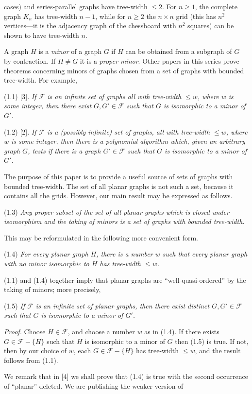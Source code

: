 \noindent cases) and series-parallel graphs have tree-width $\le 2$. For $n \ge 1$, the complete graph $K_n$ has tree-width $n - 1$, while for $n \ge 2$ the $n \times n$ grid (this has $n^2$ vertices---it is the adjacency graph of the chessboard with $n^2$ squares) can be shown to have tree-width $n$.

A graph $H$ is a \textit{minor} of a graph $G$ if $H$ can be obtained from a subgraph of $G$ by contraction. If $H \ne G$ it is a \textit{proper minor}. Other papers in this series prove theorems concerning minors of graphs chosen from a set of graphs with bounded tree-width. For example,

\stmt
(1.1) [3]. \textit{If $\mathcal{F}$ is an infinite set of graphs all with tree-width $\le w$, where $w$ is some integer, then there exist $G, G' \in \mathcal{F}$ such that $G$ is isomorphic to a minor of $G'$.}

\stmt
(1.2) [2]. \textit{If $\mathcal{F}$ is a (possibly infinite) set of graphs, all with tree-width $\le w$, where $w$ is some integer, then there is a polynomial algorithm which, given an arbitrary graph $G$, tests if there is a graph $G' \in \mathcal{F}$ such that $G$ is isomorphic to a minor of $G'$.}

The purpose of this paper is to provide a useful source of sets of graphs with bounded tree-width. The set of all planar graphs is not such a set, because it contains all the grids. However, our main result may be expressed as follows.

\stmt
(1.3) \textit{Any proper subset of the set of all planar graphs which is closed under isomorphism and the taking of minors is a set of graphs with bounded tree-width.}

This may be reformulated in the following more convenient form.

\stmt
(1.4) \textit{For every planar graph $H$, there is a number $w$ such that every planar graph with no minor isomorphic to $H$ has tree-width $\le w$.}

\stmt
(1.1) and (1.4) together imply that planar graphs are ``well-quasi-ordered'' by the taking of minors; more precisely,

\stmt
(1.5) \textit{If $\mathcal{F}$ is an infinite set of planar graphs, then there exist distinct $G, G' \in \mathcal{F}$ such that $G$ is isomorphic to a minor of $G'$.}

\textit{Proof.} Choose $H \in \mathcal{F}$, and choose a number $w$ as in (1.4). If there exists $G \in \mathcal{F} - \{H\}$ such that $H$ is isomorphic to a minor of $G$ then (1.5) is true. If not, then by our choice of $w$, each $G \in \mathcal{F} - \{H\}$ has tree-width $\le w$, and the result follows from (1.1).

We remark that in [4] we shall prove that (1.4) is true with the second occurrence of ``planar'' deleted. We are publishing the weaker version of
